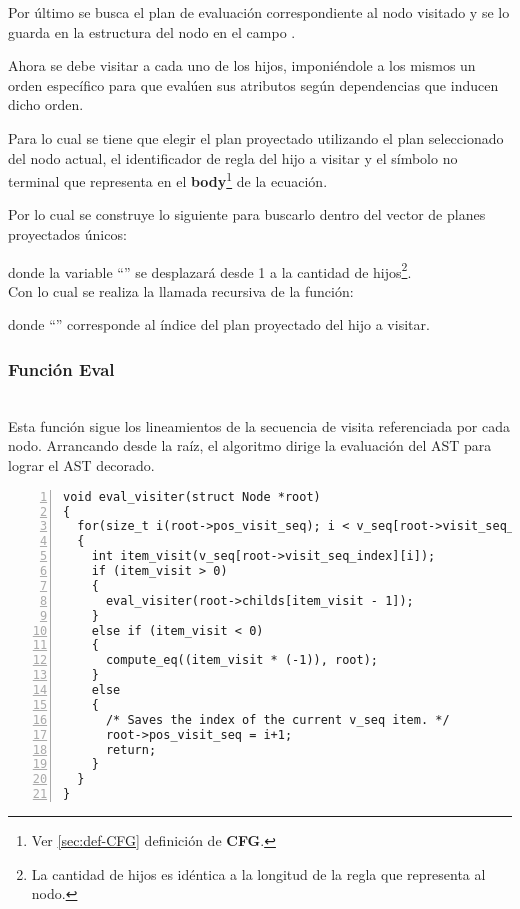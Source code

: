Por último se busca el plan de evaluación correspondiente al nodo visitado y se lo guarda en la estructura del nodo en el campo .

Ahora se debe visitar a cada uno de los hijos, imponiéndole a los mismos un orden específico para que evalúen sus atributos según dependencias que inducen dicho orden.

Para lo cual se tiene que elegir el plan proyectado utilizando el plan seleccionado del nodo actual, el identificador de regla del hijo a visitar y el símbolo no terminal que representa en el \textbf{body}\footnote{Ver \ref{sec:def-CFG} definición de \textbf{CFG}.} de la ecuación.

Por lo cual se construye lo siguiente para buscarlo dentro del vector de planes proyectados únicos:

\begin{center}\end{center}

donde la variable ``'' se desplazará desde 1 a la cantidad de hijos\footnote{La cantidad de hijos es idéntica a la longitud de la regla que representa al nodo.}.\\

Con lo cual se realiza la llamada recursiva de la función:

\begin{center}\end{center}

donde ``'' corresponde al índice del plan proyectado del hijo a visitar.
\subsubsection{Función Eval}
\\

Esta función sigue los lineamientos de la secuencia de visita referenciada por cada nodo. Arrancando desde la raíz, el algoritmo dirige la evaluación del AST para lograr el AST decorado.

\begin{lstlisting}[numbers=left, columns=fullflexible]
void eval_visiter(struct Node *root)
{
  for(size_t i(root->pos_visit_seq); i < v_seq[root->visit_seq_index].size(); i++)
  {
    int item_visit(v_seq[root->visit_seq_index][i]);
    if (item_visit > 0)
    {
      eval_visiter(root->childs[item_visit - 1]);
    }
    else if (item_visit < 0)
    {
      compute_eq((item_visit * (-1)), root);
    }
    else
    {
      /* Saves the index of the current v_seq item. */
      root->pos_visit_seq = i+1;
      return;
    }
  }
}
\end{lstlisting}

